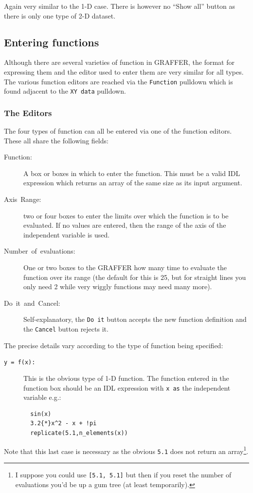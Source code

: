 \documentclass[11pt,twoside,english]{article}
\begin{document}
Again very similar to the 1-D case. There is however no ``Show all''
button as there is only one type of 2-D dataset.

\subsection{Entering functions\label{enter-fun}}

Although there are several varieties of function in GRAFFER, the format
for expressing them and the editor used to enter them are very similar
for all types. The various function editors are reached via the
\texttt{Function} pulldown which is found adjacent to the \texttt{XY
  data} pulldown.


\subsubsection{The Editors }

The four types of function can all be entered via one of the function
editors. These all share the following fields:

\begin{description}
\item [Function:]A box or boxes in which to enter the function. This
  must be a valid IDL expression which returns an array of the same
  size as its input argument.
\item [Axis~Range:]two or four boxes to enter the limits over which the
  function is to be evaluated. If no values are entered, then the range
  of the axis of the independent variable is used.
\item [Number~of~evaluations:]One or two boxes to the GRAFFER how many
  time to evaluate the function over its range (the default for this is
  25, but for straight lines you only need 2 while very wiggly
  functions may need many more).
\item [Do~it~\textmd{and}~Cancel:]Self-explanatory, the \texttt{Do it}
  button accepts the new function definition and the \texttt{Cancel}
  button rejects it.
\end{description}
The precise details vary according to the type of function being
specified:

\begin{description}
\item [\texttt{y~=~f(x):}]This is the obvious type of 1-D function. The
  function entered in the function box should be an IDL expression with
  \texttt{x as} the independent variable e.g.:

\begin{verbatim}
  sin(x)
  3.2{*}x^2 - x + !pi
  replicate(5.1,n_elements(x))
\end{verbatim}
\end{description}
Note that this last case is necessary as the obvious \texttt{5.1} does
not return an array\footnote{I suppose you could use \texttt{{[}5.1,
    5.1{]}} but then if you reset the number of evaluations you'd be up
  a gum tree (at least temporarily).}.
\end{document}
